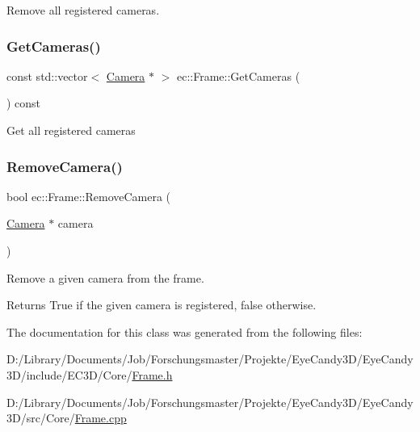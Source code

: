 Remove all registered cameras. \mbox{\label{classec_1_1_frame_ab0a5922f4be8a3565617418f447d4a5e}} 
\subsubsection{\texorpdfstring{Get\+Cameras()}{GetCameras()}}
{\footnotesize\ttfamily const std\+::vector$<$ \mbox{\hyperlink{classec_1_1_camera}{Camera}} $\ast$ $>$ ec\+::\+Frame\+::\+Get\+Cameras (\begin{DoxyParamCaption}{ }\end{DoxyParamCaption}) const}

Get all registered cameras \mbox{\label{classec_1_1_frame_a03d78a820026a27a6f18ec135283e22b}} 
\subsubsection{\texorpdfstring{Remove\+Camera()}{RemoveCamera()}}
{\footnotesize\ttfamily bool ec\+::\+Frame\+::\+Remove\+Camera (\begin{DoxyParamCaption}\item[{\mbox{\hyperlink{classec_1_1_camera}{Camera}} $\ast$}]{camera }\end{DoxyParamCaption})}

Remove a given camera from the frame. \begin{DoxyReturn}{Returns}
True if the given camera is registered, false otherwise. 
\end{DoxyReturn}


The documentation for this class was generated from the following files\+:\begin{DoxyCompactItemize}
\item 
D\+:/\+Library/\+Documents/\+Job/\+Forschungsmaster/\+Projekte/\+Eye\+Candy3\+D/\+Eye\+Candy3\+D/include/\+E\+C3\+D/\+Core/\mbox{\hyperlink{_frame_8h}{Frame.\+h}}\item 
D\+:/\+Library/\+Documents/\+Job/\+Forschungsmaster/\+Projekte/\+Eye\+Candy3\+D/\+Eye\+Candy3\+D/src/\+Core/\mbox{\hyperlink{_frame_8cpp}{Frame.\+cpp}}\end{DoxyCompactItemize}
